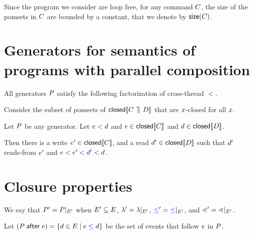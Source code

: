 Since the program we consider are loop free, for any command $C$, the size of the pomsets in $C$ are bounded by a constant, that we denote by $\mathsf{size}(C)$.  
 

\section{Generators for semantics of programs with parallel composition}
All generators $P$  satisfy the following factorization of cross-thread $\lt$.  

\begin{lemma}\label{pargen}
Consider the subset of pomsets of $\textsf{closed}\llbracket C \,\mathbin{\rrceil}\, D\rrbracket$ that are  $x$-closed for all $x$.  

Let $P$  be any generator.  
 Let $e\mathrel{{\color{blue}<}}d$ and $e \in \textsf{closed}\llbracket C\rrbracket$ and  $d \in \textsf{closed}\llbracket D\rrbracket $.
  
Then there is a write  $e' \in \textsf{closed}\llbracket C\rrbracket$, and  a read $d' \in \textsf{closed}\llbracket D\rrbracket$ such that  $d'$ reads-from $e'$ and $e \mathrel{{\color{blue}<}} e' \mathrel{{\color{blue}<}} d' \mathrel{{\color{blue}<}} d$. 




\end{lemma}

\section{Closure properties}

We say that $P' = P\mathbin{|}_{E'}$ when 
 $E' \subseteq E$,
 ${\lambda'} = {\lambda}\mathbin{|}_{E'}$, 
 ${\mathrel{{\color{blue}\leq}}'} = {\mathrel{{\color{blue}\leq}}}\mathbin{|}_{E'}$, and
 ${\lessdot'} = {\lessdot}\mathbin{|}_{E'}$.

\begin{definition}
Let $(P \mathrel{\mathsf{after}} e) = {\{ d\in E \mid e \mathrel{{\color{blue}\leq}} d
  \}}$ be the set of events that follow $e$ in $P$.
\end{definition}

